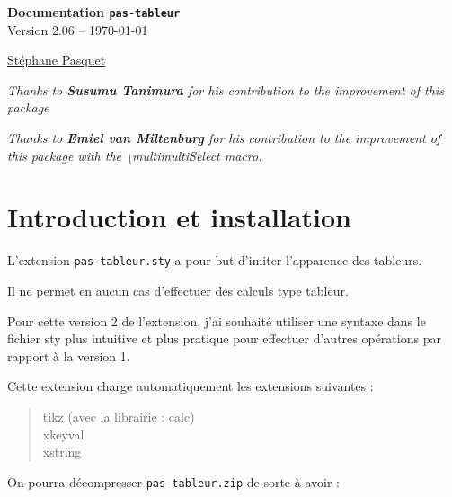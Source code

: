\documentclass[a4paper,french]{article}
\begin{document}
\begin{center}
\begin{tcolorbox}[head]
{\bfseries\LARGE Documentation \texttt{pas-tableur} }\\[3mm]
{\large Version 2.06 -- \today}
\end{tcolorbox}

{\large 
\href{http://www.mathweb.fr/contact.html}{St\'ephane Pasquet}}

{\small\emph{Thanks to \textbf{Susumu Tanimura} for his contribution to the improvement of this package}}

{\small\emph{Thanks to \textbf{Emiel van Miltenburg}  for his contribution to the improvement of this package with the \textbackslash multimultiSelect macro.}}
\end{center}

\begin{tcolorbox}[toc]
\makeatletter
{}
\makeatother
\end{tcolorbox}

\section{Introduction et installation}

L'extension \texttt{pas-tableur.sty} a pour but d'imiter l'apparence des tableurs.

Il ne permet en aucun cas d'effectuer des calculs type tableur.

\medskip

Pour cette version 2 de l'extension, j'ai souhait\'e utiliser une syntaxe dans le fichier sty plus intuitive et plus pratique pour effectuer d'autres op\'erations par rapport \`a la version 1.

\medskip

Cette extension charge automatiquement les extensions suivantes :

\medskip

\begin{quote}
tikz (avec la librairie : calc) \\
xkeyval\\
xstring
\end{quote}

\newpage

On pourra d\'ecompresser \texttt{pas-tableur.zip} 
de sorte \`a avoir :
\end{document}
